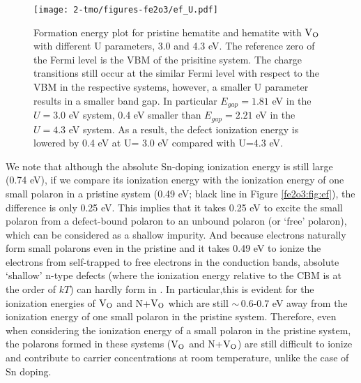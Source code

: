 

\begin{figure}[t!]
\begin{center}
\texttt{[image: 2-tmo/figures-fe2o3/ef\_U.pdf]} %
\end{center}
\caption{Formation energy plot for pristine hematite and hematite with $\text{V}_\text{O}$ with different U parameters, 3.0 and 4.3 eV. The reference zero of the Fermi level is the VBM of the prisitine system.
The charge transitions still occur at the similar Fermi level with respect to the VBM in the respective systems, however, a smaller U parameter results in a smaller band gap. In particular $E_{gap}=1.81$ eV in the $U=3.0$ eV system, 0.4 eV smaller than $E_{gap}=2.21$ eV in the $U=4.3$ eV system.
As a result, the defect ionization energy is lowered by 0.4 eV at U= 3.0 eV compared with U=4.3 eV.} \label{fe2o3:fig:efu}
\end{figure}


We note that although the absolute Sn-doping ionization energy is still large (0.74 eV), if we compare its ionization energy with the ionization energy of one small polaron in a pristine system (0.49 eV; black line in Figure \ref{fe2o3:fig:ef}), the difference is only 0.25 eV. This implies that it takes 0.25 eV to excite the small polaron from a defect-bound polaron to an unbound polaron (or `free' polaron), which can be considered as a shallow impurity. And because electrons naturally form small polarons even in the pristine  and it takes 0.49 eV to ionize the electrons from self-trapped to free electrons in the conduction bands, absolute `shallow' n-type defects (where the ionization energy relative to the CBM is at the order of $kT$) can hardly form in . In particular,this is evident for the ionization energies of $\text{V}_\text{O}$ and N+$\text{V}_\text{O}$ which are still $\sim\,$0.6-0.7 eV away from the ionization energy of one small polaron in the pristine system. Therefore, even when considering the ionization energy of a small polaron in the pristine system, the polarons formed in these systems ($\text{V}_\text{O}$ and N+$\text{V}_\text{O}$) are still difficult to ionize and contribute to carrier concentrations at room temperature, unlike the case of Sn doping. \\


